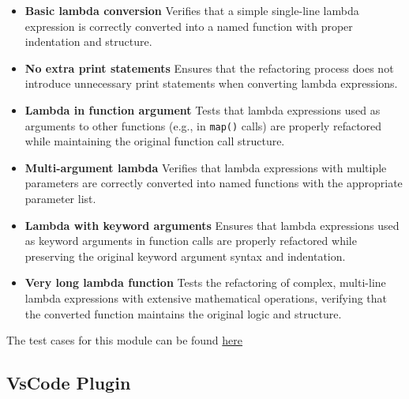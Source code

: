 \documentclass[12pt, titlepage]{article}
\begin{document}
  \begin{itemize}
    \item \textbf{Basic lambda conversion} \newline
      Verifies that a simple single-line lambda expression is
      correctly converted into a named function with proper
      indentation and structure.

    \item \textbf{No extra print statements} \newline
      Ensures that the refactoring process does not introduce
      unnecessary print statements when converting lambda expressions.

    \item \textbf{Lambda in function argument} \newline
      Tests that lambda expressions used as arguments to other
      functions (e.g., in \texttt{map()} calls) are properly
      refactored while maintaining the original function call structure.

    \item \textbf{Multi-argument lambda} \newline
      Verifies that lambda expressions with multiple parameters are
      correctly converted into named functions with the appropriate
      parameter list.

    \item \textbf{Lambda with keyword arguments} \newline
      Ensures that lambda expressions used as keyword arguments in
      function calls are properly refactored while preserving the
      original keyword argument syntax and indentation.

    \item \textbf{Very long lambda function} \newline
      Tests the refactoring of complex, multi-line lambda expressions
      with extensive mathematical operations, verifying that the
      converted function maintains the original logic and structure.
  \end{itemize}

  \noindent The test cases for this module can be found
  \href{https://github.com/ssm-lab/capstone--source-code-optimizer/blob/main/tests/refactorers/test_long_lambda_element_refactoring.py}{here}

  \subsection{VsCode Plugin}
\end{document}
